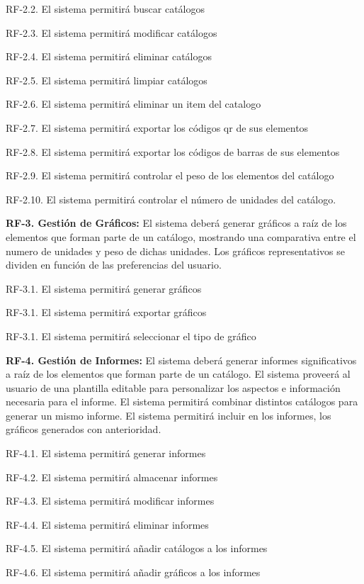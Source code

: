 \documentclass[a4paper,11pt]{book}
\begin{document}
	RF-2.2. El sistema permitirá buscar catálogos

	RF-2.3. El sistema permitirá modificar catálogos

	RF-2.4. El sistema permitirá eliminar catálogos

	RF-2.5. El sistema permitirá limpiar catálogos

	RF-2.6. El sistema permitirá eliminar un item del catalogo

	RF-2.7. El sistema permitirá exportar los códigos qr de sus elementos

	RF-2.8. El sistema permitirá exportar los códigos de barras de sus elementos

	RF-2.9. El sistema permitirá controlar el peso de los elementos del catálogo

	RF-2.10. El sistema permitirá controlar el número de unidades del catálogo. 
	

\textbf{RF-3. Gestión de Gráficos:} El sistema deberá generar gráficos a raíz de los elementos que forman parte de un catálogo, mostrando una comparativa entre el numero de unidades y peso de dichas unidades. Los gráficos representativos se dividen en función de las preferencias del usuario. 


	RF-3.1. El sistema permitirá generar gráficos
	
	RF-3.1. El sistema permitirá exportar gráficos
	
	RF-3.1. El sistema permitirá seleccionar el tipo de gráfico	


	 
\textbf{RF-4. Gestión de Informes:} El sistema deberá generar informes significativos a raíz de los elementos que forman parte de un catálogo. El sistema proveerá al usuario de una plantilla editable para personalizar los aspectos e información necesaria para el informe. El sistema permitirá combinar distintos catálogos para generar un mismo informe.  El sistema permitirá incluir en los informes, los gráficos generados con anterioridad. 

	

	RF-4.1. El sistema permitirá generar informes
	
	RF-4.2. El sistema permitirá almacenar informes
	
	RF-4.3. El sistema permitirá modificar informes
	
	RF-4.4. El sistema permitirá eliminar informes
	
	RF-4.5. El sistema permitirá añadir catálogos a los informes
	
	RF-4.6. El sistema permitirá añadir gráficos a los informes
	
\end{document}
